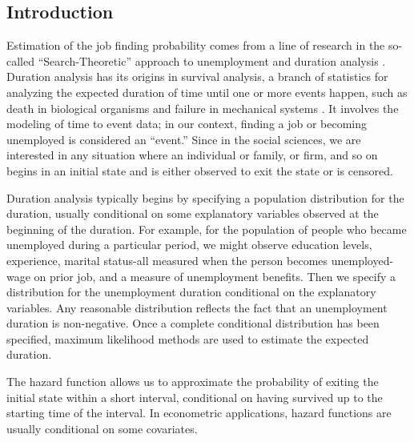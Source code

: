 \documentclass[
  11pt,
]{article}
\author{}
\date{\vspace{-2.5em}}
\numberwithin{equation}{section}
\begin{document}
\hypertarget{introduction}{%
\subsection{Introduction}\label{introduction}}

Estimation of the job finding probability comes from a line of research
in the so-called ``Search-Theoretic'' approach to unemployment and
duration analysis \citep{Pissarides2000}. Duration analysis has its
origins in survival analysis, a branch of statistics for analyzing the
expected duration of time until one or more events happen, such as death
in biological organisms and failure in mechanical systems
\citep{Lanc90}. It involves the modeling of time to event data; in our
context, finding a job or becoming unemployed is considered an
``event.'' Since in the social sciences, we are interested in any
situation where an individual or family, or firm, and so on begins in an
initial state and is either observed to exit the state or is censored.

Duration analysis typically begins by specifying a population
distribution for the duration, usually conditional on some explanatory
variables observed at the beginning of the duration. For example, for
the population of people who became unemployed during a particular
period, we might observe education levels, experience, marital
status-all measured when the person becomes unemployed-wage on prior
job, and a measure of unemployment benefits. Then we specify a
distribution for the unemployment duration conditional on the
explanatory variables. Any reasonable distribution reflects the fact
that an unemployment duration is non-negative. Once a complete
conditional distribution has been specified, maximum likelihood methods
are used to estimate the expected duration.

The hazard function allows us to approximate the probability of exiting
the initial state within a short interval, conditional on having
survived up to the starting time of the interval. In econometric
applications, hazard functions are usually conditional on some
covariates.
\end{document}
